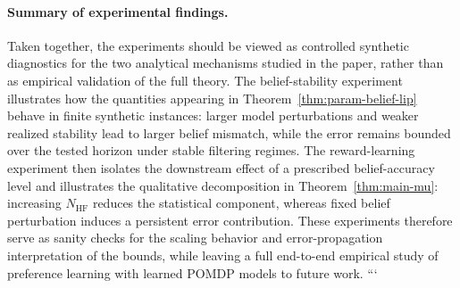 \documentclass[10pt]{article} %
\theoremstyle{plain}
\theoremstyle{definition}
\theoremstyle{remark}
\begin{document}
\paragraph{Summary of experimental findings.}
Taken together, the experiments should be viewed as controlled synthetic diagnostics for the two analytical mechanisms studied in the paper, rather than as empirical validation of the full theory. The belief-stability experiment illustrates how the quantities appearing in Theorem~\ref{thm:param-belief-lip} behave in finite synthetic instances: larger model perturbations and weaker realized stability lead to larger belief mismatch, while the error remains bounded over the tested horizon under stable filtering regimes. The reward-learning experiment then isolates the downstream effect of a prescribed belief-accuracy level and illustrates the qualitative decomposition in Theorem~\ref{thm:main-mu}: increasing \(N_{\mathrm{HF}}\) reduces the statistical component, whereas fixed belief perturbation induces a persistent error contribution. These experiments therefore serve as sanity checks for the scaling behavior and error-propagation interpretation of the bounds, while leaving a full end-to-end empirical study of preference learning with learned POMDP models to future work.
```
\end{document}
